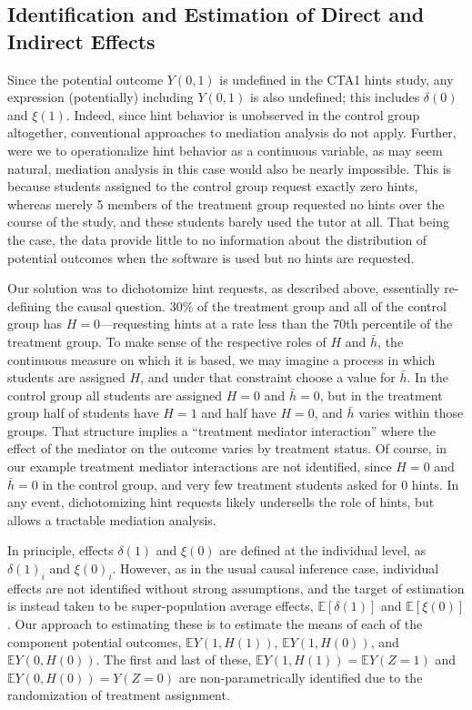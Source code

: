 \documentclass{article}\usepackage[]{graphicx}\usepackage[]{color}
\newcommand{\EE}{\mathbb{E}}
\begin{document}
\subsection{Identification and Estimation of Direct and Indirect
  Effects}

Since the potential outcome $Y(0,1)$ is undefined in the CTA1 hints
study, any expression (potentially) including $Y(0,1)$ is also
undefined; this includes $\delta(0)$ and $\xi(1)$.
Indeed, since hint behavior is unobserved in the control group
altogether, conventional approaches to mediation analysis do not
apply.
Further, were we to operationalize hint behavior as a continuous
variable, as may seem natural, mediation analysis in this case would
also be nearly impossible.
This is because students assigned to the control group request exactly
zero hints, whereas merely
5
members of the treatment group
requested no hints over the course of the study, and these students
barely used the tutor at all.
That being the case, the data provide little to no information about
the distribution of potential outcomes when the software is used
but no hints are requested.

Our solution was to dichotomize hint requests, as
described above, essentially re-defining the causal question.
30\% of the treatment group and all of the control group has
$H=0$---requesting hints at a rate less than the
70th percentile of the treatment group.
To make sense of the respective roles of $H$ and $\bar{h}$, the
continuous measure on which it is based, we may imagine a process in
which students are assigned $H$, and under that constraint choose a
value for $\bar{h}$.
In the control group all students are assigned $H=0$ and $\bar{h}=0$, but
in the treatment group half of students have $H=1$ and half have
$H=0$, and $\bar{h}$ varies within those groups.
That structure implies a ``treatment mediator interaction''
where the effect of the mediator on the outcome varies by treatment
status.
Of course, in our example treatment mediator interactions are not
identified, since $H=0$ and $\bar{h}=0$ in the control group, and very
few treatment students asked for 0 hints.
In any event, dichotomizing hint requests likely undersells the role
of hints, but allows a tractable mediation analysis.

In principle, effects $\delta(1)$ and $\xi(0)$ are defined at the
individual level, as $\delta(1)_i$ and $\xi(0)_i$.
However, as in the usual causal inference case, individual effects are
not identified without strong assumptions, and the target of
estimation is instead taken to be super-population average effects,
$\EE[\delta(1)]$ and $\EE[\xi(0)]$. Our approach to estimating these
is to estimate the means of each of the component potential outcomes,
$\EE Y(1,H(1))$, $\EE Y(1,H(0))$, and $\EE Y(0,H(0))$.
The first and last of these, $\EE Y(1,H(1))=\EE Y(Z=1)$ and $\EE
Y(0,H(0))=Y(Z=0)$ are non-parametrically identified due to the
randomization of treatment assignment.
\end{document}

